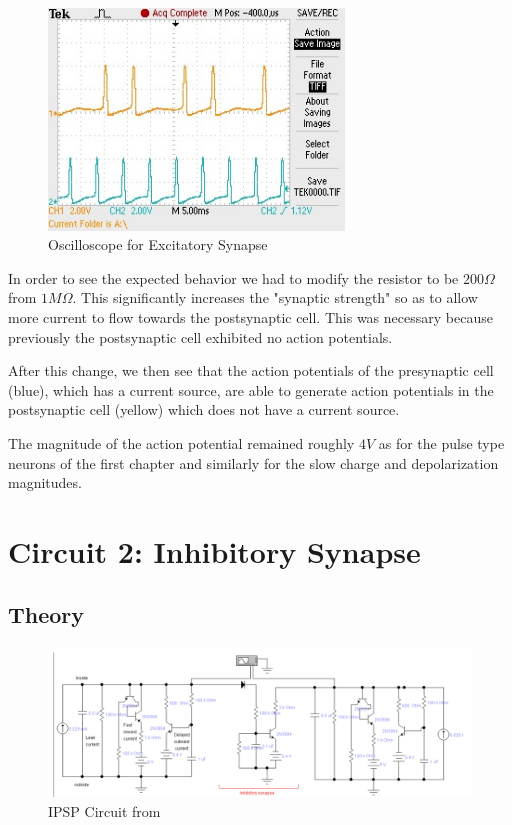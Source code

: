 \documentclass[12]{book}
\newcommand\0{\mathbf{0}}
\newcommand\<{\langle}
\renewcommand\>{\rangle}
\begin{document}
\begin{figure}[H]
\centering
\includegraphics[width=0.7\textwidth]{excitatory.jpg}
\caption{Oscilloscope for Excitatory Synapse}
\end{figure}

In order to see the expected behavior we had to modify the resistor to be $200 \Omega$ from $1 M \Omega$. This significantly increases the "synaptic strength" so as to allow more current to flow towards the postsynaptic cell. This was necessary because previously the postsynaptic cell exhibited no action potentials.

After this change, we then see that the action potentials of the presynaptic cell (blue), which has a current source, are able to generate action potentials in the postsynaptic cell (yellow) which does not have a current source.  

The magnitude of the action potential remained roughly $4V$ as for the pulse type neurons of the first chapter and similarly for the slow charge and depolarization magnitudes.

\section{Circuit 2: Inhibitory Synapse}

\subsection{Theory}

\begin{figure}[H]
\centering
\includegraphics[width=\textwidth]{inhibitory_circuit}	
\caption{IPSP Circuit from \cite{levitan2015neuron}}
\end{figure}
\end{document}
